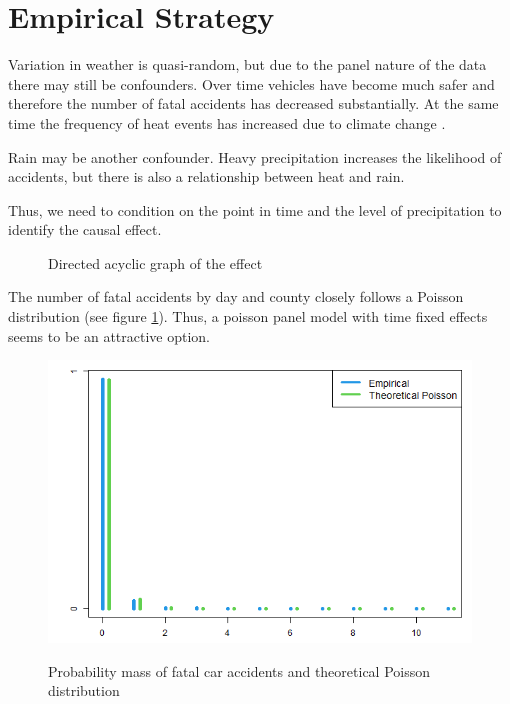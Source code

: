 
\section{Empirical Strategy}

Variation in weather is quasi-random, but due to the panel nature of the data there may still be confounders. Over time vehicles have become much safer and therefore the number of fatal accidents has decreased substantially. At the same time the frequency of heat events has increased due to climate change \citep[see e.g.][]{Habeeb_2015}. 

Rain may be another confounder. Heavy precipitation increases the likelihood of accidents, but there is also a relationship between heat and rain.

Thus, we need to condition on the point in time and the level of precipitation to identify the causal effect.


\begin{figure}[h]
	\centering
	\caption{Directed acyclic graph of the effect}
\end{figure}

The number of fatal accidents by day and county closely follows a Poisson distribution (see figure \ref{PoissonGraph}). Thus, a poisson panel model with time fixed effects seems to be an attractive option.

\begin{figure}[h]
	\centering
	\includegraphics[scale = 0.5]{"../Code & Data/Poisson.png"}
	\label{PoissonGraph}
	\caption{Probability mass of fatal car accidents and theoretical Poisson distribution}
\end{figure}

